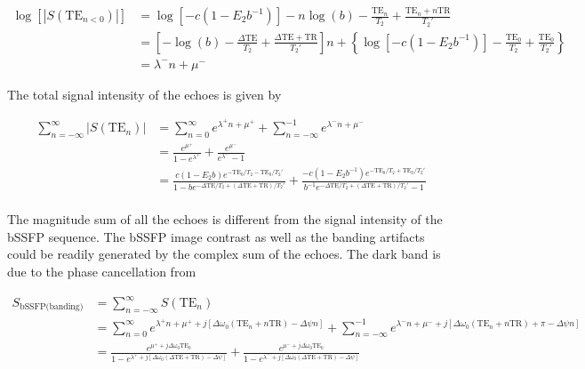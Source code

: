 \documentclass[AMA,STIX2COL,Linenumberson]{MRM}
\begin{document}
\begin{equation}
  \begin{aligned}
    \log\left[|S(\text{TE}_{n< 0})|\right] &= \log\left[-c(1-E_2b^{-1})\right] - n\log(b) - \frac{\text{TE}_n}{T_2} + \frac{\text{TE}_n+n\text{TR}}{T_2'}\\
    & = \left[-\log(b) - \frac{\Delta\text{TE}}{T_2} + \frac{\Delta \text{TE}+\text{TR}}{T_2'} \right]n + \left\{\log\left[-c(1-E_2b^{-1})\right] - \frac{\text{TE}_0}{T_2} + \frac{\text{TE}_0}{T_2'}\right\}\\
    &= \lambda^- n + \mu^-
  \end{aligned}
\end{equation}  


The total signal intensity of the echoes is given by

$$\begin{aligned}
\sum_{n=-\infty}^{\infty} |S(\text{TE}_n)| &= \sum_{n=0}^\infty e^{\lambda^+ n + \mu^+} + \sum_{n=-\infty}^{-1} e^{\lambda^- n + \mu^-}\\
&= \frac{e^{\mu^+}}{1-e^{\lambda^+}} + \frac{e^{\mu^-}}{e^{\lambda^-}-1}\\
&= \frac{c(1-E_2b)e^{-\text{TE}_0/T_2-\text{TE}_0/T_2'}}{1-b e^{-\Delta\text{TE}/T_2+(\Delta\text{TE}+\text{TR})/T_2'}} + \frac{-c(1-E_2b^{-1})e^{-\text{TE}_0/T_2+\text{TE}_0/T_2'}}{b^{-1}e^{-\Delta\text{TE}/T_2+(\Delta\text{TE}+\text{TR})/T_2'} -1} \\
\end{aligned}$$

The magnitude sum of all the echoes is different from the signal intensity of the bSSFP sequence. The bSSFP image contrast as well as the banding artifacts could be readily generated by the complex sum of the echoes. The dark band is due to the phase cancellation from

$$\begin{aligned}
S_{\text{bSSFP(banding)}} &= \sum_{n=-\infty}^{\infty} S(\text{TE}_n)\\
&=\sum_{n=0}^{\infty} e^{\lambda^+ n + \mu^+ + j[\Delta\omega_0(\text{TE}_n+n\text{TR})-\Delta\psi n]} + \sum_{n=-\infty}^{-1} e^{\lambda^- n + \mu^- + j[\Delta\omega_0(\text{TE}_n+n\text{TR})+\pi-\Delta\psi n]}\\
&= \frac{e^{\mu^+ + j\Delta\omega_0\text{TE}_0}}{1-e^{\lambda^+ + j[\Delta\omega_0(\Delta\text{TE}+\text{TR})-\Delta\psi]}}  + \frac{e^{\mu^- + j\Delta\omega_0\text{TE}_0}}{1-e^{\lambda^- + j[\Delta\omega_0(\Delta\text{TE}+\text{TR})-\Delta\psi]}}\\
\end{aligned}$$
\end{document}
